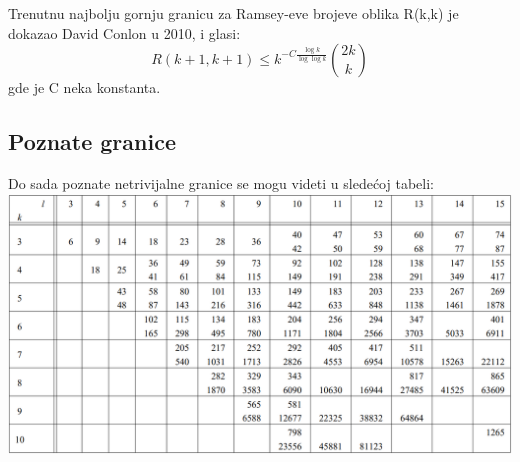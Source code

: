 \documentclass[12pt,a4paper]{article}
\begin{document}
Trenutnu najbolju gornju granicu za Ramsey-eve brojeve oblika R(k,k) je dokazao David Conlon u 2010, i glasi:
\[R(k+1,k+1)\leq k^{-C\frac{\log{k}}{\log{\log{k}}}}\binom{2k}{k}\]
gde je C neka konstanta.
\subsection{Poznate granice}
Do sada poznate netrivijalne granice se mogu videti u sledećoj tabeli:\\
\includegraphics[width=\textwidth]{poznateGranice.png} %
\end{document}
